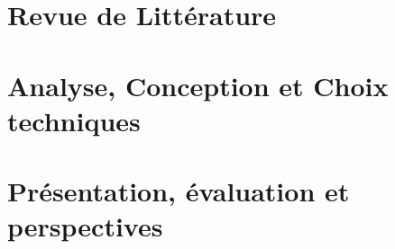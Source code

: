 \documentclass{ifri}
\begin{document}
\chapter{Revue de Littérature}\label{chap:1}
 
 
 \chapter{Analyse, Conception et Choix techniques}\label{chap:2}
 
 
\chapter{Présentation, évaluation et perspectives}\label{chap:3}
 
 
% 

% 
\lhead[]{} \rhead[]{} \chead[]{}

\nocite{*}





\cleardoublepage



%

\newpage
\tableofcontents
\end{document}
